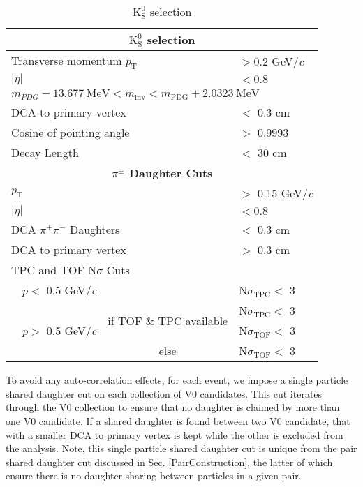 \documentclass[ALICE,manyauthors]{cernphprep}
\newcommand{\Ks}{$\mathrm{K^{0}_{S}}$\xspace}
\begin{document}
\begin{table}[htbp]
 \centering
  \begin{tabular}{lc|c|l}
   \hline  
   \multicolumn{4}{c}{\textbf{\Ks selection}} \\
   \hline
   \multicolumn{3}{l|}{Transverse momentum $p_{\mathrm{T}}$} & $> 0.2$ GeV/\textit{c} \\
   \hline
   \multicolumn{3}{l|}{$|\eta|$} & $< 0.8$ \\
   \hline
   \multicolumn{4}{l}{$m_{PDG}-13.677 \ \mathrm{MeV} < m_{\mathrm{inv}} < m_{\mathrm{PDG}} + 2.0323 \ \mathrm{MeV}$} \\ 
   \hline
   \multicolumn{3}{l|}{DCA to primary vertex} & $<$ 0.3 cm \\
   \hline
   \multicolumn{3}{l|}{Cosine of pointing angle} & $>$ 0.9993 \\
   \hline
   \multicolumn{3}{l|}{Decay Length} & $<$ 30 cm \\
   \hline
      
   
   \multicolumn{4}{c}{\textbf{$\pi^{\pm}$ Daughter Cuts}} \\
   \hline
   \multicolumn{3}{l|}{$p_{\mathrm{T}}$} & $>$ 0.15 GeV/\textit{c} \\
   \hline
   \multicolumn{3}{l|}{$|\eta|$} &  $< 0.8$ \\
   \hline
   \multicolumn{3}{l|}{DCA $\pi^{+}\pi^{-}$ Daughters} & $<$ 0.3 cm \\
   \hline
   \multicolumn{3}{l|}{DCA to primary vertex} & $>$ 0.3 cm \\
   \hline
   \multicolumn{4}{l}{TPC and TOF N$\sigma$ Cuts} \\
   \cline{2-4}
    & \multicolumn{1}{c}{$p <$ 0.5 GeV/\textit{c}} &  & N$\sigma_{\mathrm{TPC}} <$ 3 \\
   \cline{2-4}
    & \multicolumn{1}{c}{\multirow{3}{*}{$p >$ 0.5 GeV/\textit{c}}} &  \multirow{2}{*}{if TOF \& TPC available} & N$\sigma_{\mathrm{TPC}} <$ 3 \\
    & \multicolumn{2}{c|}{} & N$\sigma_{\mathrm{TOF}} <$ 3 \\
   \cline{3-4}
    & \multicolumn{1}{c}{} & else & N$\sigma_{\mathrm{TOF}} <$ 3 \\
   \hline   
  \end{tabular}
 \caption{\Ks selection}
 \label{tab:K0sCuts} 
\end{table}

To avoid any auto-correlation effects, for each event, we impose a single particle shared daughter cut on each collection of V0 candidates.
This cut iterates through the V0 collection to ensure that no daughter is claimed by more than one V0 candidate.
If a shared daughter is found between two V0 candidate, that with a smaller DCA to primary vertex is kept while the other is excluded from the analysis.
Note, this single particle shared daughter cut is unique from the pair shared daughter cut discussed in Sec. \ref{PairConstruction}, the latter of which ensure there is no daughter sharing between particles in a given pair.
\end{document}
